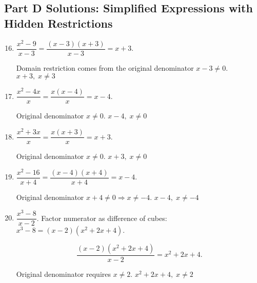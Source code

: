 \documentclass[12pt]{article}
\begin{document}
\subsection*{Part D Solutions: Simplified Expressions with Hidden Restrictions}
\begin{enumerate}
  \setcounter{enumi}{15}
  \item \(\dfrac{x^2 - 9}{x - 3}
  = \dfrac{(x-3)(x+3)}{x-3}
  = x + 3.\)
  
  Domain restriction comes from the original denominator \(x - 3 \ne 0\).  
  \(\boxed{x + 3,\; x \ne 3}\)

  \item \(\dfrac{x^2 - 4x}{x}
  = \dfrac{x(x - 4)}{x}
  = x - 4.\)
  
  Original denominator \(x \ne 0.\)  
  \(\boxed{x - 4,\; x \ne 0}\)

  \item \(\dfrac{x^2 + 3x}{x}
  = \dfrac{x(x + 3)}{x}
  = x + 3.\)
  
  Original denominator \(x \ne 0.\)  
  \(\boxed{x + 3,\; x \ne 0}\)

  \item \(\dfrac{x^2 - 16}{x + 4}
  = \dfrac{(x - 4)(x + 4)}{x + 4}
  = x - 4.\)
  
  Original denominator \(x + 4 \ne 0 \Rightarrow x \ne -4.\)  
  \(\boxed{x - 4,\; x \ne -4}\)

  \item \(\dfrac{x^3 - 8}{x - 2}\).  
  Factor numerator as difference of cubes:  
  \(x^3 - 8 = (x - 2)(x^2 + 2x + 4).\)

  \[
  \dfrac{(x - 2)(x^2 + 2x + 4)}{x - 2} = x^2 + 2x + 4.
  \]

  Original denominator requires \(x \ne 2.\)  
  \(\boxed{x^2 + 2x + 4,\; x \ne 2}\)
\end{enumerate}
\end{document}
